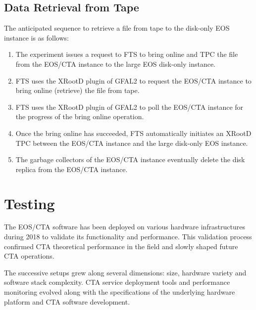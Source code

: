 \documentclass{webofc}
\begin{document}
\subsection{Data Retrieval from Tape}
The anticipated sequence to retrieve a file from tape to the disk-only EOS instance is as follows:
\begin{enumerate}
\item The experiment issues a request to FTS to bring online and TPC the file from the EOS/CTA instance
to the large EOS disk-only instance.
\item FTS uses the XRootD plugin of GFAL2 to request the EOS/CTA instance to bring online (retrieve)
the file from tape.
\item FTS uses the XRootD plugin of GFAL2 to poll the EOS/CTA instance for the progress of the bring
online operation.
\item Once the bring online has succeeded, FTS automatically initiates an XRootD TPC between the EOS/CTA
instance and the large disk-only EOS instance.
\item The garbage collectors of the EOS/CTA instance eventually delete the disk replica from the
EOS/CTA instance.
\end{enumerate}

\section{Testing}
\label{Testing}

%

The EOS/CTA software has been deployed on various hardware infrastructures during 2018 to validate its
functionality and performance. This validation process confirmed CTA theoretical performance in the field
and slowly shaped future CTA operations.

The successive setups grew along several dimensions: size, hardware variety and software stack complexity.
CTA service deployment tools and performance monitoring evolved along with the specifications of the
underlying hardware platform and CTA software development.
\end{document}
